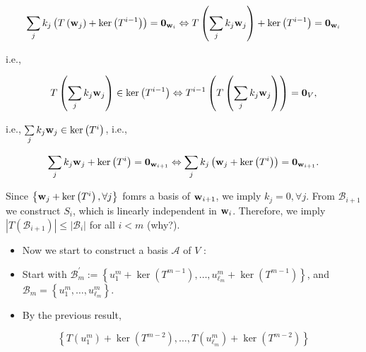 \documentclass[11pt]{article}
\begin{document}
\[
\mathop{\sum }\limits_{j}{k}_{j}\left( {T\left( {\bf w}_{j}\right)  + \ker \left( {T}^{i - 1}\right) }\right)  = {\mathbf{0}}_{{\bf w}_{i}} \Leftrightarrow  T\left( {\mathop{\sum }\limits_{j}{k}_{j}{\bf w}_{j}}\right)  + \ker \left( {T}^{i - 1}\right)  = {\mathbf{0}}_{{\bf w}_{i}}
\]

i.e.,

\[
T\left( {\mathop{\sum }\limits_{j}{k}_{j}{\bf w}_{j}}\right)  \in  \ker \left( {T}^{i - 1}\right)  \Leftrightarrow  {T}^{i - 1}\left( {T\left( {\mathop{\sum }\limits_{j}{k}_{j}{\bf w}_{j}}\right) }\right)  = {\mathbf{0}}_{V},
\]

i.e., \(\mathop{\sum }\limits_{j}{k}_{j}{\bf w}_{j} \in  \ker \left( {T}^{i}\right)\), i.e.,

\[
\mathop{\sum }\limits_{j}{k}_{j}{\bf w}_{j} + \ker \left( {T}^{i}\right)  = {\mathbf{0}}_{{\bf w}_{i + 1}} \Leftrightarrow  \mathop{\sum }\limits_{j}{k}_{j}\left( {{\bf w}_{j} + \ker \left( {T}^{i}\right) }\right)  = {\mathbf{0}}_{{\bf w}_{i + 1}}.
\]

Since \(\left\{  {{\bf w}_{j} + \ker \left( {T}^{i}\right) ,\forall j}\right\}\) fomrs a basis of \({\bf w}_{i + 1}\), we imply \({k}_{j} = 0,\forall j\). From \({\mathcal{B}}_{i + 1}\) we construct \({S}_{i}\), which is linearly independent in \({\bf w}_{i}\). Therefore, we imply \(\left| {T\left( {\mathcal{B}}_{i + 1}\right) }\right|  \leq  \left| {\mathcal{B}}_{i}\right|\) for all \(i < m\) (why?).

\begin{itemize}
\item Now we start to construct a basis \(\mathcal{A}\) of \(V\) :
\end{itemize}

\begin{itemize}
\item Start with \({\mathcal{B}}_{m}^{\prime } \mathrel{\text{ := }} \left\{  {{u}_1^{m} + \ker \left( {T}^{m - 1}\right) ,\ldots ,{u}_{{\ell }_{m}}^{m} + \ker \left( {T}^{m - 1}\right) }\right\}\), and \({\mathcal{B}}_{m} = \left\{  {{u}_1^{m},\ldots ,{u}_{{\ell }_{m}}^{m}}\right\}\).
\end{itemize}

\begin{itemize}
\item By the previous result,
\end{itemize}

\[
\left\{  {T\left( {u}_1^{m}\right)  + \ker \left( {T}^{m - 2}\right) ,\ldots ,T\left( {u}_{{\ell }_{m}}^{m}\right)  + \ker \left( {T}^{m - 2}\right) }\right\}
\]
\end{document}

